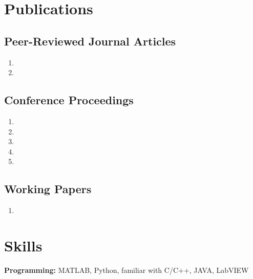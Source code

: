 \documentclass[10pt,letterpaper]{article}
\begin{document}
\vspace{-0.25in}

\section*{Publications}
\vspace{-0.05in}


\subsection*{Peer-Reviewed Journal Articles}

\begin{enumerate}
\item {}
\item {}
\end{enumerate}

\subsection*{Conference Proceedings}

\begin{enumerate}[resume]
\item {}
\item {}
\item {}
\item {}
\item {}
\end{enumerate}

\subsection*{Working Papers}
\begin{enumerate}[resume]
\item {}
\end{enumerate}

\vspace{-0.25in}

\section*{Skills}
\vspace{-0.05in}
\hspace{1.5em}\textbf{Programming:} MATLAB, Python, familiar with C/C++, JAVA, LabVIEW
\end{document}
